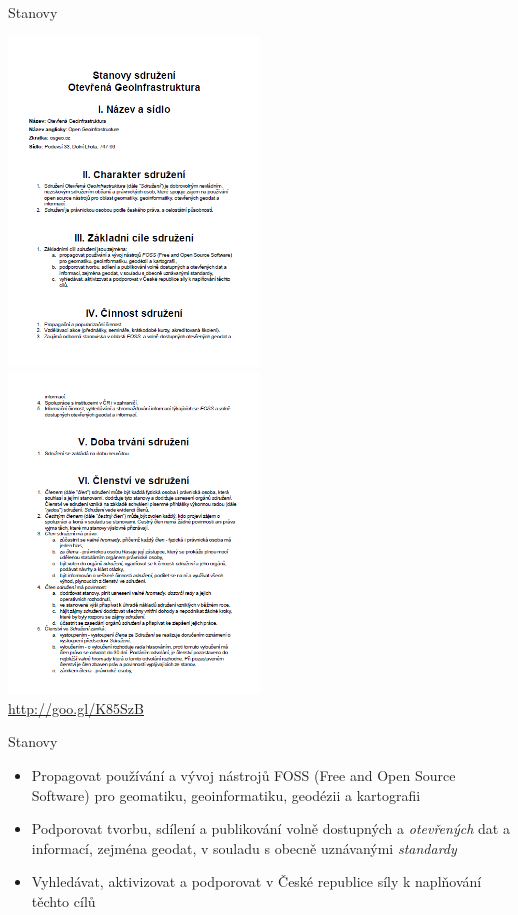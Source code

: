 \documentclass[xcolor=dvipsnames]{beamer}
\begin{document}
\begin{frame}{Stanovy}
\begin{center}
    \includegraphics[width=0.5\textwidth]{imgs/stanovyI.png}
    \includegraphics[width=0.5\textwidth]{imgs/stanovyII.png}\\
    \url{http://goo.gl/K85SzB}
\end{center}
\end{frame}

\begin{frame}{Stanovy}
\begin{itemize}[<+->]
    \item Propagovat používání a vývoj nástrojů FOSS (Free and Open Source
    Software) pro geomatiku, geoinformatiku, geodézii a kartografii
    \item \alert{Podporovat tvorbu, sdílení a publikování volně dostupných a
    {\em otevřených} dat a informací, zejména geodat, v souladu s obecně uznávanými
    \emph{standardy}}
    \item Vyhledávat, aktivizovat a podporovat v České republice síly k
    naplňování těchto cílů
\end{itemize}
\end{frame}
\end{document}
